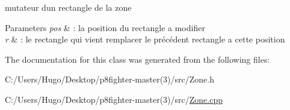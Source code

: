 mutateur d\textquotesingle{}un rectangle de la zone 


\begin{DoxyParams}{Parameters}
{\em pos} & \+: la position du rectangle a modifier \\
\hline
{\em r} & \+: le rectangle qui vient remplacer le précédent rectangle a cette position \\
\hline
\end{DoxyParams}


The documentation for this class was generated from the following files\+:\begin{DoxyCompactItemize}
\item 
C\+:/\+Users/\+Hugo/\+Desktop/p8fighter-\/master(3)/src/Zone.\+h\item 
C\+:/\+Users/\+Hugo/\+Desktop/p8fighter-\/master(3)/src/\hyperlink{_zone_8cpp}{Zone.\+cpp}\end{DoxyCompactItemize}
